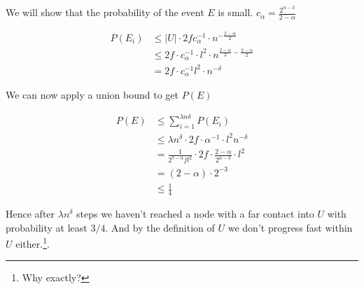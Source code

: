 \begin{pr}
We will show that the probability of the event $E$ is small. $c_\alpha = \frac{2^{\alpha-3}}{2-\alpha}$

\begin{align*}
P(E_i) &\leq |U| \cdot 2fc_\alpha^{-1} \cdot n^{-\frac{2-\alpha}{2}}\\
	&\leq 2f\cdot c_\alpha^{-1} \cdot l^2 \cdot n^{\frac{2-\alpha}{3} -\frac{2-\alpha}{2}}\\
	&=2f\cdot c_\alpha ^{-1} l^2 \cdot n^{-\delta}
\end{align*}

We can now apply a union bound to get $P(E)$

\begin{align*}
P(E) &\leq\sum_{i=1}^{\lambda n\delta} P(E_i)\\
	&\leq  \lambda n^\delta \cdot 2f\cdot \alpha^{-1} \cdot l^2 n^{-\delta}\\
	&= \frac{1}{2^{7-\alpha} fl^2} \cdot 2f\cdot \frac{2-\alpha}{2^{\alpha-3}} \cdot l^2\\
	&=(2-\alpha)\cdot 2^{-3}\\
	&\leq \frac{1}{4}
\end{align*}

Hence after $\lambda n^\delta$ steps we haven't reached a node with a far contact into $U$ with probability at least $3/4$. And by the definition of $U$ we don't progress fast within $U$ either.\footnote{Why exactly?}.
\end{pr}
